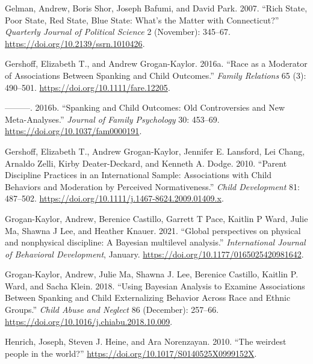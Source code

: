 \documentclass[
  letterpaper,
  DIV=11,
  numbers=noendperiod]{scrreprt}
\newlength{\cslhangindent}
\newlength{\cslentryspacingunit} %
\newenvironment{CSLReferences}[2] %
 {%
  \setlength{\parindent}{0pt}
  \ifodd #1
  \let\oldpar\par
  \def\par{\hangindent=\cslhangindent\oldpar}
  \fi
  \setlength{\parskip}{#2\cslentryspacingunit}
 }%
 {}
\begin{document}
\begin{CSLReferences}{1}{0}
\leavevmode{}%
Gelman, Andrew, Boris Shor, Joseph Bafumi, and David Park. 2007. {``Rich
State, Poor State, Red State, Blue State: What's the Matter with
Connecticut?''} \emph{Quarterly Journal of Political Science} 2
(November): 345--67. \url{https://doi.org/10.2139/ssrn.1010426}.

\leavevmode{}%
Gershoff, Elizabeth T., and Andrew Grogan-Kaylor. 2016a. {``{Race as a
Moderator of Associations Between Spanking and Child Outcomes}.''}
\emph{Family Relations} 65 (3): 490--501.
\url{https://doi.org/10.1111/fare.12205}.

\leavevmode{}%
---------. 2016b. {``Spanking and Child Outcomes: Old Controversies and
New Meta-Analyses.''} \emph{Journal of Family Psychology} 30: 453--69.
\url{https://doi.org/10.1037/fam0000191}.

\leavevmode{}%
Gershoff, Elizabeth T., Andrew Grogan-Kaylor, Jennifer E. Lansford, Lei
Chang, Arnaldo Zelli, Kirby Deater-Deckard, and Kenneth A. Dodge. 2010.
{``Parent Discipline Practices in an International Sample: Associations
with Child Behaviors and Moderation by Perceived Normativeness.''}
\emph{Child Development} 81: 487--502.
\url{https://doi.org/10.1111/j.1467-8624.2009.01409.x}.

\leavevmode{}%
Grogan-Kaylor, Andrew, Berenice Castillo, Garrett T Pace, Kaitlin P
Ward, Julie Ma, Shawna J Lee, and Heather Knauer. 2021. {``{Global
perspectives on physical and nonphysical discipline: A {B}ayesian
multilevel analysis}.''} \emph{International Journal of Behavioral
Development}, January. \url{https://doi.org/10.1177/0165025420981642}.

\leavevmode{}%
Grogan-Kaylor, Andrew, Julie Ma, Shawna J. Lee, Berenice Castillo,
Kaitlin P. Ward, and Sacha Klein. 2018. {``Using {B}ayesian Analysis to
Examine Associations Between Spanking and Child Externalizing Behavior
Across Race and Ethnic Groups.''} \emph{Child Abuse and Neglect} 86
(December): 257--66. \url{https://doi.org/10.1016/j.chiabu.2018.10.009}.

\leavevmode{}%
Henrich, Joseph, Steven J. Heine, and Ara Norenzayan. 2010. {``{The
weirdest people in the world?}''}
\url{https://doi.org/10.1017/S0140525X0999152X}.


\end{CSLReferences}
\end{document}
